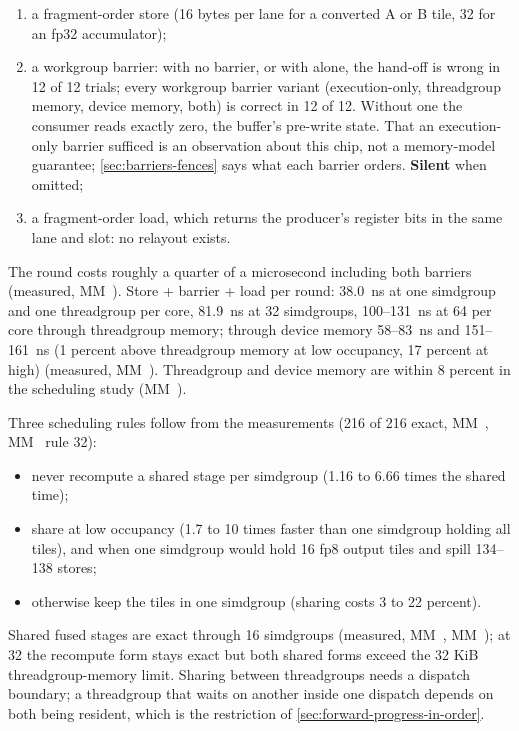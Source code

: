 \begin{enumerate}
\def\labelenumi{\arabic{enumi}.}
\item a fragment-order store (16 bytes per lane for a converted A or B tile, 32 for an fp32 accumulator);
\item a workgroup barrier: with no barrier, or with  alone, the hand-off is wrong in 12 of 12
  trials; every workgroup barrier variant (execution-only, threadgroup memory, device memory, both) is correct in 12
  of 12. Without one the consumer reads exactly zero, the buffer's pre-write state. That an execution-only barrier
  sufficed is an observation about this chip, not a memory-model guarantee; \cref{sec:barriers-fences} says what each barrier
  orders. \textbf{Silent} when omitted;
\item a fragment-order load, which returns the producer's register bits in the same lane and slot: no relayout exists.
\end{enumerate}

The round costs roughly a quarter of a microsecond including both barriers (measured, MM~). Store + barrier + load
per round: 38.0~ns at one simdgroup and one threadgroup per core, 81.9~ns at 32 simdgroups, 100–131~ns at 64 per core
through threadgroup memory; through device memory 58–83~ns and 151–161~ns (1 percent above threadgroup memory at low
occupancy, 17 percent at high) (measured, MM~). Threadgroup and device memory are within 8 percent in the scheduling
study (MM~).

Three scheduling rules follow from the measurements (216 of 216 exact, MM~, MM~ rule 32):

\begin{itemize}
\item never recompute a shared stage per simdgroup (1.16 to 6.66 times the shared time);
\item share at low occupancy (1.7 to 10 times faster than one simdgroup holding all tiles), and when one simdgroup would
  hold 16 fp8 output tiles and spill 134–138 stores;
\item otherwise keep the tiles in one simdgroup (sharing costs 3 to 22 percent).
\end{itemize}

Shared fused stages are exact through 16 simdgroups (measured, MM~, MM~); at 32 the recompute form
stays exact but both shared forms exceed the 32 KiB threadgroup-memory limit. Sharing between threadgroups needs a
dispatch boundary; a threadgroup that waits on another inside one dispatch depends on both being resident, which is
the restriction of \cref{sec:forward-progress-in-order}.

